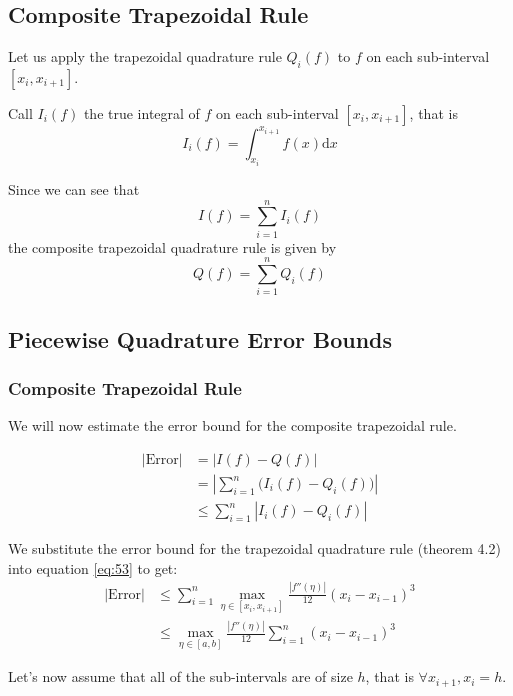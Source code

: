 \documentclass[12pt,letterpaper]{article}
\newcommand{\dd}{\mathrm{d}}
\begin{document}
\subsection{Composite Trapezoidal Rule}

Let us apply the trapezoidal quadrature rule $Q_i(f)$ to $f$ on each sub-interval $[x_i, x_{i+1}]$.

Call $I_i(f)$ the true integral of $f$ on each sub-interval $[x_i, x_{i+1}]$, that is
\begin{equation}
	I_i(f) = \int_{x_i}^{x_{i+1}} f(x) \dd x
\end{equation}

Since we can see that 
\begin{equation}
	I(f) = \sum_{i=1}^n I_i(f)
\end{equation}
the composite trapezoidal quadrature rule is given by
\begin{equation}
	Q(f) = \sum_{i=1}^n Q_i(f)
\end{equation}

\subsection{Piecewise Quadrature Error Bounds}
\subsubsection{Composite Trapezoidal Rule}
We will now estimate the error bound for the composite trapezoidal rule.

\begin{align}
	\big| \text{Error} \big| &= \left	| I(f) - Q(f) \right| \\
	&= \left| \sum_{i=1}^n \big(I_i(f) - Q_i(f) \big) \right| \\
	&\leq \sum_{i=1}^n \left| I_i(f) - Q_i(f) \right| \label{eq:53}
\end{align}

We substitute the error bound for the trapezoidal quadrature rule (theorem 4.2) into equation \ref{eq:53} to get:
\begin{align}
	\big| \text{Error} \big| &\leq \sum_{i=1}^n \max_{\eta \in [x_i, x_{i+1}]} \frac{\left| f''(\eta) \right|}{12} (x_i - x_{i-1})^3 \\
	&\leq \max_{\eta \in [a,b]} \frac{\left| f''(\eta) \right|}{12} \sum_{i=1}^n (x_i - x_{i-1})^3 \label{eq:55}
\end{align}

Let's now assume that all of the sub-intervals are of size $h$, that is $\forall x_{i+1}, x_i = h$.
\end{document}
